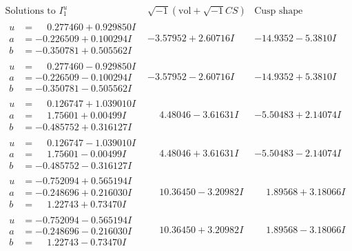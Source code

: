 \documentclass[1p]{elsarticle_modified}
\theoremstyle{definition}
\newcommand{\I}{\sqrt{-1}}
\begin{document}
$$\begin{array}{c|c|c}  
\text{Solutions to }I^u_{1}& \I (\text{vol} + \sqrt{-1}CS) & \text{Cusp shape}\\
 \hline 
\begin{aligned}
u &= \phantom{-}0.277460 + 0.929850 I \\
a &= -0.226509 + 0.100294 I \\
b &= -0.350781 + 0.505562 I\end{aligned}
 & -3.57952 + 2.60716 I & -14.9352 - 5.3810 I \\ \hline\begin{aligned}
u &= \phantom{-}0.277460 - 0.929850 I \\
a &= -0.226509 - 0.100294 I \\
b &= -0.350781 - 0.505562 I\end{aligned}
 & -3.57952 - 2.60716 I & -14.9352 + 5.3810 I \\ \hline\begin{aligned}
u &= \phantom{-}0.126747 + 1.039010 I \\
a &= \phantom{-}1.75601 + 0.00499 I \\
b &= -0.485752 + 0.316127 I\end{aligned}
 & \phantom{-}4.48046 - 3.61631 I & -5.50483 + 2.14074 I \\ \hline\begin{aligned}
u &= \phantom{-}0.126747 - 1.039010 I \\
a &= \phantom{-}1.75601 - 0.00499 I \\
b &= -0.485752 - 0.316127 I\end{aligned}
 & \phantom{-}4.48046 + 3.61631 I & -5.50483 - 2.14074 I \\ \hline\begin{aligned}
u &= -0.752094 + 0.565194 I \\
a &= -0.248696 + 0.216030 I \\
b &= \phantom{-}1.22743 + 0.73470 I\end{aligned}
 & \phantom{-}10.36450 - 3.20982 I & \phantom{-}1.89568 + 3.18066 I \\ \hline\begin{aligned}
u &= -0.752094 - 0.565194 I \\
a &= -0.248696 - 0.216030 I \\
b &= \phantom{-}1.22743 - 0.73470 I\end{aligned}
 & \phantom{-}10.36450 + 3.20982 I & \phantom{-}1.89568 - 3.18066 I \\ \hline\begin{aligned}

\end{aligned}
\end{array}$$
\end{document}
